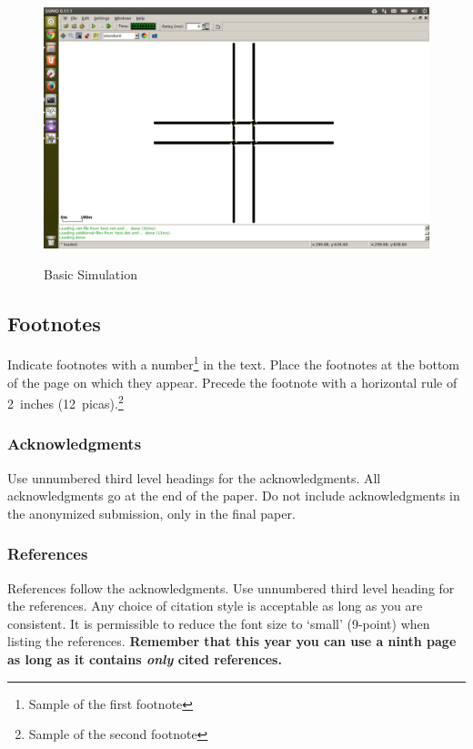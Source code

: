 \documentclass{article} %
\begin{document}
\begin{figure}
\caption{Basic Simulation}
\includegraphics[width=\textwidth]{images/gridoptimum.png}
\label{fig:gridoptimum}

\end{figure}


\subsection{Footnotes}

Indicate footnotes with a number\footnote{Sample of the first footnote} in the
text. Place the footnotes at the bottom of the page on which they appear.
Precede the footnote with a horizontal rule of 2~inches
(12~picas).\footnote{Sample of the second footnote}

\subsubsection*{Acknowledgments}

Use unnumbered third level headings for the acknowledgments. All
acknowledgments go at the end of the paper. Do not include 
acknowledgments in the anonymized submission, only in the 
final paper. 

\subsubsection*{References}

References follow the acknowledgments. Use unnumbered third level heading for
the references. Any choice of citation style is acceptable as long as you are
consistent. It is permissible to reduce the font size to `small' (9-point) 
when listing the references. {\bf Remember that this year you can use
a ninth page as long as it contains \emph{only} cited references.}
\end{document}

